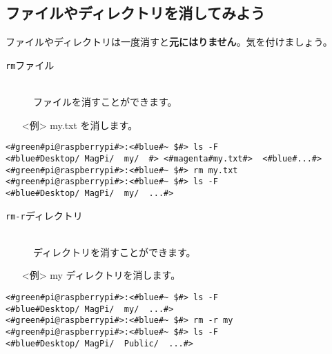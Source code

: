 \subsection{ファイルやディレクトリを消してみよう}
ファイルやディレクトリは一度消すと\textbf{元にはりません}。気を付けましょう。
\begin{description}
\item[\texttt{rm}\textvisiblespace ファイル]\mbox{}\\
ファイルを消すことができます。
\end{description}
\begin{itemize}
\item[<例>]my.txt を消します。
\end{itemize}
\begin{lstlisting}[caption=cpの例, label=cp]
<#green#pi@raspberrypi#>:<#blue#~ $#> ls -F
<#blue#Desktop/	MagPi/	my/	 #>	<#magenta#my.txt#>	<#blue#...#>
<#green#pi@raspberrypi#>:<#blue#~ $#> rm my.txt
<#green#pi@raspberrypi#>:<#blue#~ $#> ls -F
<#blue#Desktop/	MagPi/	my/	 ...#>
\end{lstlisting}
\begin{description}
\item[\texttt{rm}\textvisiblespace \texttt{-r}\textvisiblespace ディレクトリ]\mbox{}\\
ディレクトリを消すことができます。
\end{description}
\begin{itemize}
\item[<例>]my ディレクトリを消します。
\end{itemize}
\begin{lstlisting}[caption=cp -rの例, label=cp-R]
<#green#pi@raspberrypi#>:<#blue#~ $#> ls -F
<#blue#Desktop/	MagPi/	my/	 ...#>
<#green#pi@raspberrypi#>:<#blue#~ $#> rm -r my
<#green#pi@raspberrypi#>:<#blue#~ $#> ls -F
<#blue#Desktop/	MagPi/	Public/	 ...#>
\end{lstlisting}
\begin{tcolorbox}[title=\useOmetoi]
\begin{enumerate}
\end{enumerate}
\end{tcolorbox}
